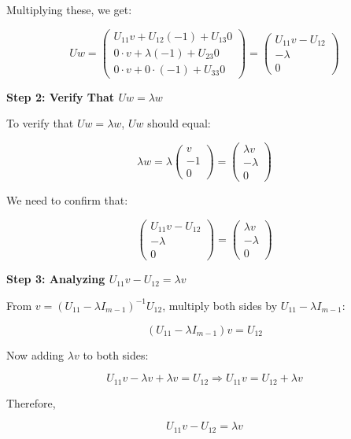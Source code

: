 \documentclass[8pt]{article}
\begin{document}
{Multiplying these, we get:

\[
Uw = \begin{pmatrix}
U_{11}v + U_{12}(-1) + U_{13}0 \\
0 \cdot v + \lambda(-1) + U_{23}0 \\
0 \cdot v + 0 \cdot (-1) + U_{33}0
\end{pmatrix} = \begin{pmatrix}
U_{11}v - U_{12} \\
-\lambda \\
0
\end{pmatrix}
\]

\textbf{Step 2: Verify That \(Uw = \lambda w\)}

To verify that \(Uw = \lambda w\), \(Uw\) should equal:

\[
\lambda w = \lambda \begin{pmatrix}
v \\
-1 \\
0
\end{pmatrix} = \begin{pmatrix}
\lambda v \\
-\lambda \\
0
\end{pmatrix}
\]

We need to confirm that:

\[
\begin{pmatrix}
U_{11}v - U_{12} \\
-\lambda \\
0
\end{pmatrix} = \begin{pmatrix}
\lambda v \\
-\lambda \\
0
\end{pmatrix}
\]

\textbf{Step 3: Analyzing \(U_{11}v - U_{12} = \lambda v\)}

From \(v = (U_{11} - \lambda I_{m-1})^{-1} U_{12}\), multiply both sides by \(U_{11} - \lambda I_{m-1}\):

\[
(U_{11} - \lambda I_{m-1})v = U_{12}
\]

Now adding \(\lambda v\) to both sides:

\[
U_{11}v - \lambda v + \lambda v = U_{12} \Rightarrow U_{11}v = U_{12} + \lambda v
\]

Therefore,

\[
U_{11}v - U_{12} = \lambda v
\]


}
\end{document}
